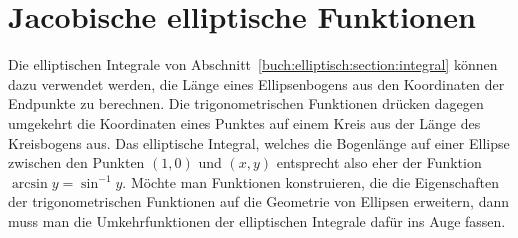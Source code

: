 %
%
%
\section{Jacobische elliptische Funktionen
\label{buch:elliptisch:section:jacobi}}
Die elliptischen Integrale von
Abschnitt~\ref{buch:elliptisch:section:integral}
können dazu verwendet werden, die Länge eines Ellipsenbogens aus
den Koordinaten der Endpunkte zu berechnen.
Die trigonometrischen Funktionen drücken dagegen umgekehrt die
Koordinaten eines Punktes auf einem Kreis aus der Länge des
Kreisbogens aus.
Das elliptische Integral, welches die Bogenlänge auf einer Ellipse zwischen
den Punkten $(1,0)$ und $(x,y)$ entsprecht also eher der Funktion
$\arcsin y=\sin^{-1}y$.
Möchte man Funktionen konstruieren, die die Eigenschaften der 
trigonometrischen Funktionen auf die Geometrie von Ellipsen erweitern,
dann muss man die Umkehrfunktionen der elliptischen Integrale dafür ins
Auge fassen.


